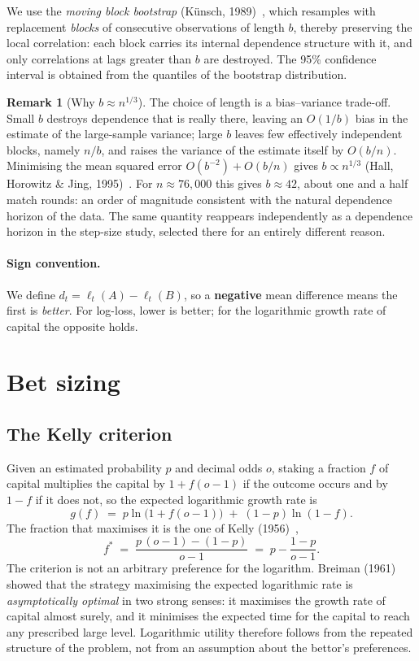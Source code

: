 \documentclass[12pt,a4paper,oneside]{report}
\renewcommand{\_}{\oldunderscore\allowbreak}
\theoremstyle{definition}
\theoremstyle{plain}
\theoremstyle{definition}   %
\newtheorem{remark}[theorem]{Remark}
\begin{document}
We use the \emph{moving block bootstrap} (Künsch, 1989)~\cite{kunsch1989}, which resamples with replacement
\emph{blocks} of consecutive observations of length $b$, thereby preserving the local
correlation: each block carries its internal dependence structure with it, and only correlations
at lags greater than $b$ are destroyed. The 95\% confidence interval is obtained from the
quantiles of the bootstrap distribution.

\begin{remark}[Why $b \approx n^{1/3}$]
\label{rem:blocklen}
The choice of length is a bias--variance trade-off. Small $b$ destroys dependence that is really
there, leaving an $O(1/b)$ bias in the estimate of the large-sample variance; large $b$ leaves
few effectively independent blocks, namely $n/b$, and raises the variance of the estimate itself
by $O(b/n)$. Minimising the mean squared error $O(b^{-2}) + O(b/n)$ gives $b \propto n^{1/3}$
(Hall, Horowitz \& Jing, 1995)~\cite{hall1995}. For $n \approx 76{,}000$ this gives $b \approx 42$, about one and
a half match rounds: an order of magnitude consistent with the natural dependence horizon of
the data. The same quantity reappears independently as a dependence horizon in the step-size
study, selected there for an entirely different reason.
\end{remark}

\paragraph{Sign convention.} We define $d_t = \ell_t(A) - \ell_t(B)$, so a \textbf{negative} mean
difference means the first is \emph{better}. For log-loss, lower is better; for the logarithmic
growth rate of capital the opposite holds.

\section{Bet sizing}

\subsection{The Kelly criterion}
\label{sec:kelly-theory}

Given an estimated probability $p$ and decimal odds $o$, staking a fraction $f$ of capital
multiplies the capital by $1+f(o-1)$ if the outcome occurs and by $1-f$ if it does not, so the
expected logarithmic growth rate is
\[
g(f) \;=\; p\ln\big(1+f(o-1)\big) \;+\; (1-p)\ln(1-f).
\]
The fraction that maximises it is the one of Kelly (1956)~\cite{kelly1956},
\[
f^{*} \;=\; \frac{p\,(o-1) - (1-p)}{o-1} \;=\; p - \frac{1-p}{o-1}.
\]
The criterion is not an arbitrary preference for the logarithm. Breiman (1961)~\cite{breiman1961} showed that the
strategy maximising the expected logarithmic rate is \emph{asymptotically optimal} in two strong
senses: it maximises the growth rate of capital almost surely, and it minimises the expected time
for the capital to reach any prescribed large level. Logarithmic utility therefore follows from
the repeated structure of the problem, not from an assumption about the bettor's preferences.
\end{document}
